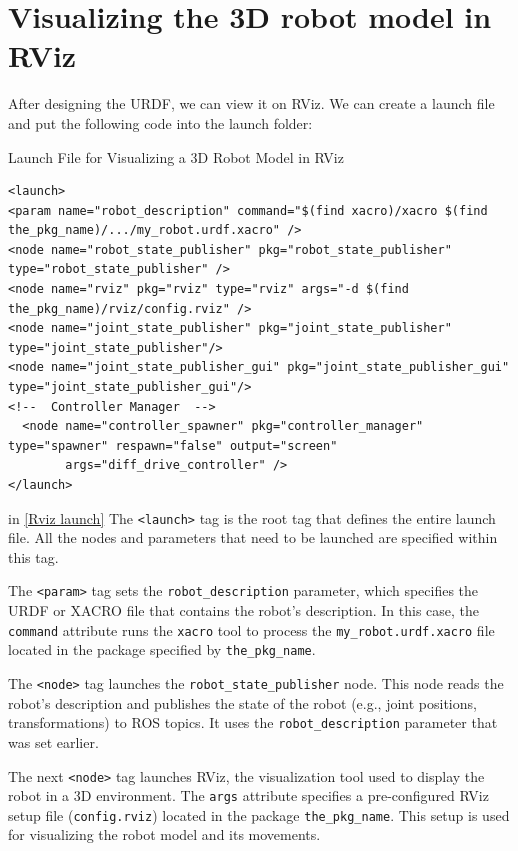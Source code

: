\documentclass[../../main]{subfiles}
\begin{document}
\section{Visualizing the 3D robot model in RViz}
After designing the URDF, we can view it on RViz.
We can create a launch file and put the following code into the launch folder:
\begin{codebox}[label=Rviz launch]{Launch File for Visualizing a 3D Robot Model in RViz}
  \begin{verbatim}
<launch>
<param name="robot_description" command="$(find xacro)/xacro $(find the_pkg_name)/.../my_robot.urdf.xacro" />
<node name="robot_state_publisher" pkg="robot_state_publisher" type="robot_state_publisher" />
<node name="rviz" pkg="rviz" type="rviz" args="-d $(find the_pkg_name)/rviz/config.rviz" />
<node name="joint_state_publisher" pkg="joint_state_publisher" 
type="joint_state_publisher"/>
<node name="joint_state_publisher_gui" pkg="joint_state_publisher_gui" type="joint_state_publisher_gui"/>
<!--  Controller Manager  -->
  <node name="controller_spawner" pkg="controller_manager" type="spawner" respawn="false" output="screen"
        args="diff_drive_controller" /> 
</launch>
    \end{verbatim}
  \end{codebox}
in \cref{Rviz launch} The \texttt{<launch>} tag is the root tag that defines the entire launch file. All the nodes and parameters that need to be launched are specified within this tag.

    The \texttt{<param>} tag sets the \texttt{robot\_description} parameter, which specifies the URDF or XACRO file that contains the robot’s description. In this case, the \texttt{command} attribute runs the \texttt{xacro} tool to process the \texttt{my\_robot.urdf.xacro} file located in the package specified by \texttt{the\_pkg\_name}.
    
    The \texttt{<node>} tag launches the \texttt{robot\_state\_publisher} node. This node reads the robot’s description and publishes the state of the robot (e.g., joint positions, transformations) to ROS topics. It uses the \texttt{robot\_description} parameter that was set earlier.
    
    The next \texttt{<node>} tag launches RViz, the visualization tool used to display the robot in a 3D environment. The \texttt{args} attribute specifies a pre-configured RViz setup file (\texttt{config.rviz}) located in the package \texttt{the\_pkg\_name}. This setup is used for visualizing the robot model and its movements.
    
\end{document}
